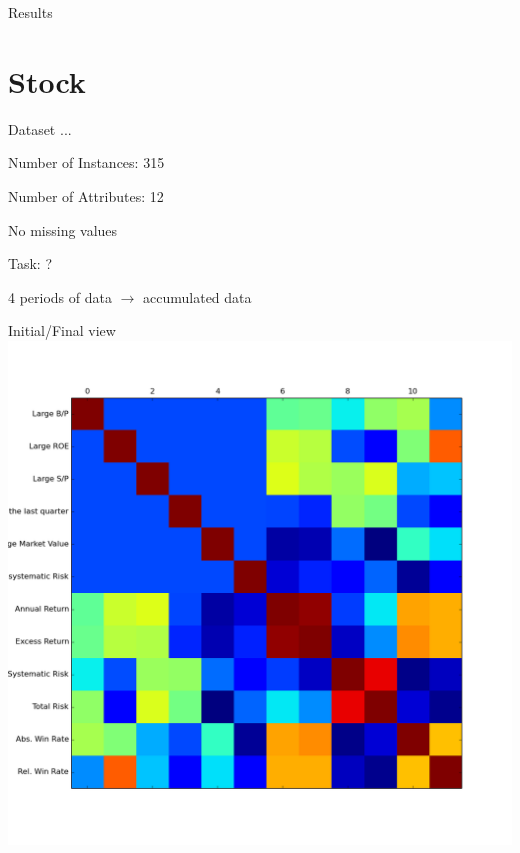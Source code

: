 \documentclass[12pt]{beamer}
\begin{document}
\begin{frame}{Results}
\resizebox{\linewidth}{!}{}
\end{frame}

\section{Stock}
\begin{frame}{Dataset}
...

Number of Instances: 315

Number of Attributes: 12

No missing values

Task: ?

4 periods of data $\rightarrow$ accumulated data
\end{frame}

\begin{frame}{Initial/Final view}
\includegraphics[height=\textheight,width=\textwidth,keepaspectratio]{plots/stock_final.png}
\end{frame}
\end{document}
